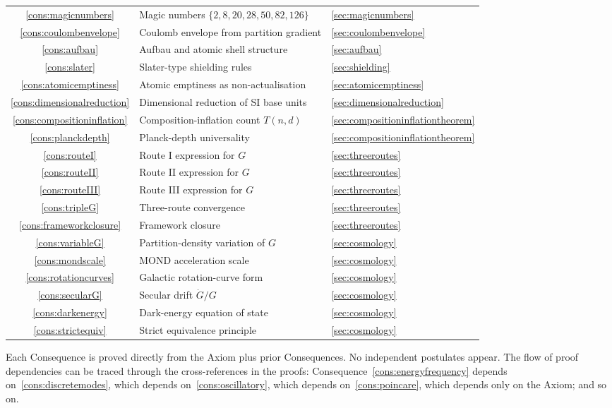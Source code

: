 \documentclass[11pt,twocolumn,a4paper]{article}
\theoremstyle{axiomstyle}
\theoremstyle{conseqstyle}
\theoremstyle{definition}
\theoremstyle{remark}
\begin{document}
\begin{center}
\begin{tabular}{c|l|l}
\ref{cons:magicnumbers} & Magic numbers $\{2,8,20,28,50,82,126\}$ & \ref{sec:magicnumbers}\\
\ref{cons:coulombenvelope} & Coulomb envelope from partition gradient & \ref{sec:coulombenvelope}\\
\ref{cons:aufbau} & Aufbau and atomic shell structure & \ref{sec:aufbau}\\
\ref{cons:slater} & Slater-type shielding rules & \ref{sec:shielding}\\
\ref{cons:atomicemptiness} & Atomic emptiness as non-actualisation & \ref{sec:atomicemptiness}\\
\ref{cons:dimensionalreduction} & Dimensional reduction of SI base units & \ref{sec:dimensionalreduction}\\
\ref{cons:compositioninflation} & Composition-inflation count $T(n,d)$ & \ref{sec:compositioninflationtheorem}\\
\ref{cons:planckdepth} & Planck-depth universality & \ref{sec:compositioninflationtheorem}\\
\ref{cons:routeI} & Route I expression for $G$ & \ref{sec:threeroutes}\\
\ref{cons:routeII} & Route II expression for $G$ & \ref{sec:threeroutes}\\
\ref{cons:routeIII} & Route III expression for $G$ & \ref{sec:threeroutes}\\
\ref{cons:tripleG} & Three-route convergence & \ref{sec:threeroutes}\\
\ref{cons:frameworkclosure} & Framework closure & \ref{sec:threeroutes}\\
\ref{cons:variableG} & Partition-density variation of $G$ & \ref{sec:cosmology}\\
\ref{cons:mondscale} & MOND acceleration scale & \ref{sec:cosmology}\\
\ref{cons:rotationcurves} & Galactic rotation-curve form & \ref{sec:cosmology}\\
\ref{cons:secularG} & Secular drift $\dot G/G$ & \ref{sec:cosmology}\\
\ref{cons:darkenergy} & Dark-energy equation of state & \ref{sec:cosmology}\\
\ref{cons:strictequiv} & Strict equivalence principle & \ref{sec:cosmology}\\
\bottomrule
\end{tabular}
\end{center}

Each Consequence is proved directly from the Axiom plus prior Consequences. No independent postulates appear. The flow of proof dependencies can be traced through the cross-references in the proofs: Consequence~\ref{cons:energyfrequency} depends on~\ref{cons:discretemodes}, which depends on~\ref{cons:oscillatory}, which depends on~\ref{cons:poincare}, which depends only on the Axiom; and so on.
\end{document}

